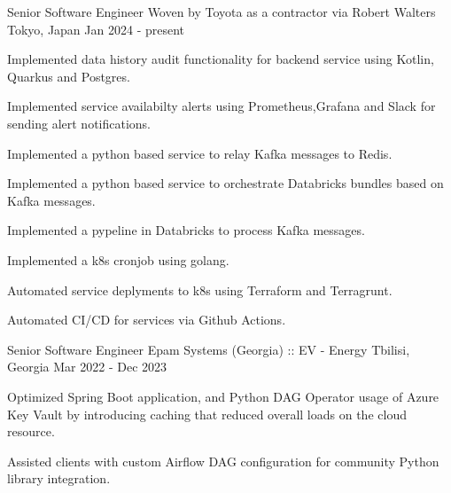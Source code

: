 

\begin{cventries}

  \cventry
    {Senior Software Engineer} %
    {Woven by Toyota as a contractor via Robert Walters} %
    {Tokyo, Japan} %
    {Jan 2024 - present} %
    {
      \begin{cvitems} %
        \item {Implemented data history audit functionality for backend service using Kotlin, Quarkus and Postgres.}
        \item {Implemented service availabilty alerts using Prometheus,Grafana and Slack for sending alert notifications.}
        \item {Implemented a python based service to relay Kafka messages to Redis.}
        \item {Implemented a python based service to orchestrate Databricks bundles based on Kafka messages.}
        \item {Implemented a pypeline in Databricks to process Kafka messages.}
        \item {Implemented a k8s cronjob using golang.}
        \item {Automated service deplyments to k8s using Terraform and Terragrunt.}
        \item {Automated CI/CD for services via Github Actions.}
      \end{cvitems}
    }
  \cventry
    {Senior Software Engineer} %
    {Epam Systems (Georgia) :: EV - Energy} %
    {Tbilisi, Georgia} %
    {Mar 2022 - Dec 2023} %
    {
      \begin{cvitems} %
        \item {Optimized Spring Boot application, and Python DAG Operator usage of Azure Key Vault by introducing caching that reduced overall loads on the cloud resource.}
        \item {Assisted clients with custom Airflow DAG configuration for community Python library integration.}

\end{cvitems}}
\end{cventries}
